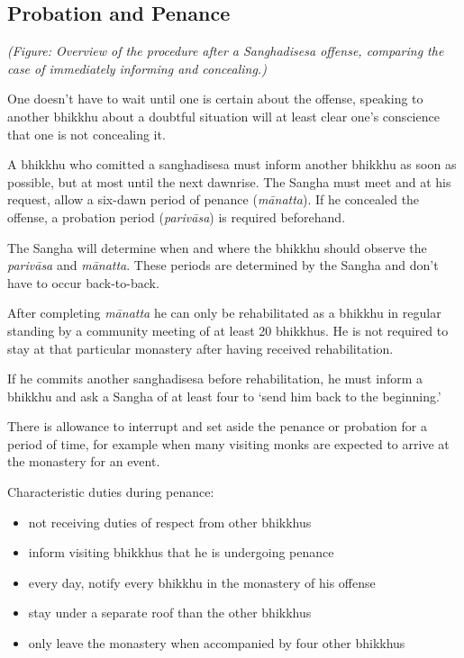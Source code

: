 \subsection{Probation and Penance}

\enlargethispage*{4\baselineskip}
\par
{}
\par
\clearpage

\emph{(Figure: Overview of the procedure after a Sanghadisesa offense,
comparing the case of immediately informing and concealing.)}

One doesn't have to wait until one is certain about the offense,
speaking to another bhikkhu about a doubtful situation will at least
clear one's conscience that one is not concealing it.

A bhikkhu who comitted a sanghadisesa must inform another bhikkhu as
soon as possible, but at most until the next dawnrise. The Sangha must
meet and at his request, allow a six-dawn period of penance
(\emph{mānatta}). If he concealed the offense, a probation period
(\emph{parivāsa}) is required beforehand.

The Sangha will determine when and where the bhikkhu should observe the
\emph{parivāsa} and \emph{mānatta}. These periods are determined by the
Sangha and don't have to occur back-to-back.

After completing \emph{mānatta} he can only be rehabilitated as a
bhikkhu in regular standing by a community meeting of at least 20
bhikkhus. He is not required to stay at that particular monastery after
having received rehabilitation.

If he commits another sanghadisesa before rehabilitation, he must inform
a bhikkhu and ask a Sangha of at least four to `send him back to the
beginning.'

There is allowance to interrupt and set aside the penance or probation
for a period of time, for example when many visiting monks are expected
to arrive at the monastery for an event.

Characteristic duties during penance:

\begin{itemize}
\tightlist
\item
  not receiving duties of respect from other bhikkhus
\item
  inform visiting bhikkhus that he is undergoing penance
\item
  every day, notify every bhikkhu in the monastery of his offense
\item
  stay under a separate roof than the other bhikkhus
\item
  only leave the monastery when accompanied by four other bhikkhus
\end{itemize}

